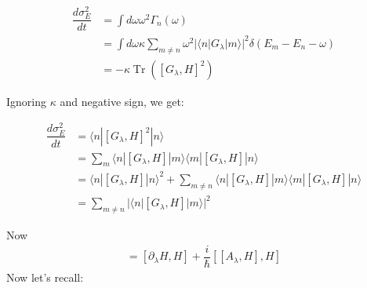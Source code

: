 \documentclass[11pt,a4paper]{article}
\DeclareMathOperator{\Tr}{Tr}
\begin{document}
\begin{align}
 \dfrac{d \sigma^2_E}{dt}&= \int d\omega \omega^2 \Gamma_n (\omega)\\
  &=\int d\omega \kappa\sum_{m \neq n}  \omega^2 |\langle n | G_{\lambda} | m \rangle |^2 \delta(E_m-E_n- \omega)\\
  &=-\kappa \Tr ([G_{\lambda}, H]^2)
\end{align}

Ignoring $\kappa$ and negative sign, we get:

\begin{align}
\dfrac{d \sigma^2_E}{dt}&=  \langle n |  [G_{\lambda}, H]^2  |    n \rangle  \\
&= \sum_{m} \langle n |  [G_{\lambda}, H]|  m \rangle \langle m |  [G_{\lambda}, H]  |    n \rangle \\
&= \langle n |  [G_{\lambda}, H]|  n \rangle ^2   +   \sum_{m \neq n} \langle n |  [G_{\lambda}, H]|  m \rangle \langle m |  [G_{\lambda}, H]  |    n \rangle \\
&=  \sum_{m \neq n} |\langle n |  [G_{\lambda}, H]|  m \rangle |^2
\end{align}

Now \begin{align*}
 [G_{\lambda}, H]= [\partial_{\lambda} H,H] + \dfrac{i}{\hbar} [[A_{\lambda} , H],H]
\end{align*}
Now let's recall:
\end{document}

